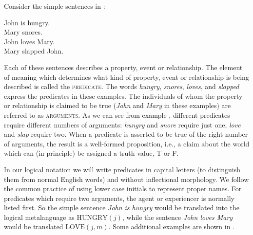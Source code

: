Consider the simple sentences in :


\ea \label{ex:4.22}
\ea John is hungry.\\
\ex Mary snores.\\
\ex John loves Mary.\\
\ex Mary slapped John.
                       \z
\z


Each of these sentences describes a property, event or relationship. The element of meaning which determines what kind of property, event or relationship is being described is called the \textsc{predicate}. The words \textit{hungry}, \textit{snores}, \textit{loves}, and \textit{slapped} express the predicates in these examples. The individuals of whom the property or relationship is claimed to be true (\textit{John} and \textit{Mary} in these examples) are referred to as \textsc{arguments}. As we can see from example , different predicates require different numbers of arguments: \textit{hungry} and \textit{snore} require just one, \textit{love} and \textit{slap} require two. When a predicate is asserted to be true of the right number of arguments, the result is a well-formed proposition, i.e., a claim about the world which can (in principle) be assigned a truth value, T or F.



In our logical notation we will write predicates in capital letters (to distinguish them from normal English words) and without inflectional morphology. We follow the common practice of using lower case initials to represent proper names. For predicates which require two arguments, the agent or experiencer is normally listed first. So the simple sentence \textit{John is hungry} would be translated into the logical metalanguage as $\text{HUNGRY}(j)$, while the sentence \textit{John loves Mary} would be translated $\text{LOVE}(j,m)$. Some additional examples are shown in .




